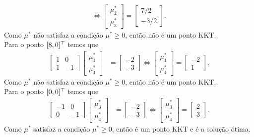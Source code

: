 \begin{questions}
\begin{solution}
\begin{align*}
        \Leftrightarrow \begin{bmatrix} \mu_2^*\\ \mu_3^*\end{bmatrix} = \begin{bmatrix} 7/2\\ -3/2\end{bmatrix}.
    \end{align*}
    Como $\mu^*$ não satisfaz a condição $\mu^* \ge 0$, então não é um ponto KKT.\\
    Para o ponto $[8,0]^\top$ temos que
        \begin{align*}
        \begin{bmatrix} 1 & 0 \\ 1 & -1 \end{bmatrix}\begin{bmatrix} \mu_1^*\\ \mu_4^*\end{bmatrix} &= \begin{bmatrix} -2\\ -3 \end{bmatrix}
        \Leftrightarrow \begin{bmatrix} \mu_1^*\\ \mu_4^*\end{bmatrix} = \begin{bmatrix} -2\\ 1\end{bmatrix}.
    \end{align*}
    Como $\mu^*$ não satisfaz a condição $\mu^* \ge 0$, então não é um ponto KKT.\\
    Para o ponto $[0,0]^\top$ temos que
        \begin{align*}
        \begin{bmatrix} -1 & 0 \\ 0 & -1 \end{bmatrix}\begin{bmatrix} \mu_3^*\\ \mu_4^*\end{bmatrix} &= \begin{bmatrix} -2\\ -3 \end{bmatrix}
        \Leftrightarrow \begin{bmatrix} \mu_3^*\\ \mu_4^*\end{bmatrix} = \begin{bmatrix} 2\\ 3\end{bmatrix}.
    \end{align*}
    Como $\mu^*$ satisfaz a condição $\mu^* \ge 0$, então é um ponto KKT e é a solução ótima.
\end{solution}


\end{questions}
